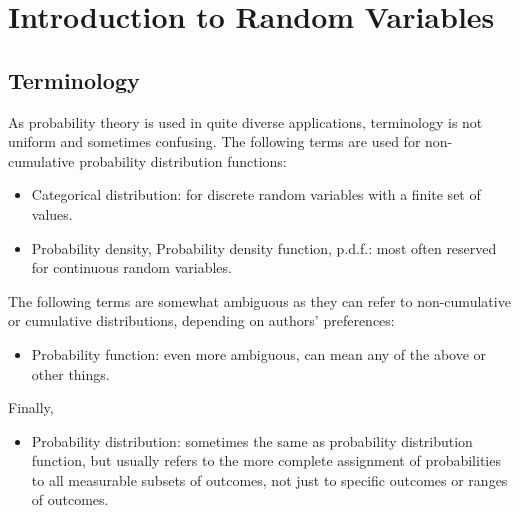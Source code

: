 \documentclass[a4paper,12pt]{article}
\begin{document}
\chapter{Introduction to Random Variables}
\section{Terminology}
As probability theory is used in quite diverse applications, terminology is not uniform and sometimes confusing. The following terms are used for non-cumulative probability distribution functions:
\begin{itemize}
\itemProbability mass, Probability mass function, p.m.f.: for discrete random variables.
\item Categorical distribution: for discrete random variables with a finite set of values.
\item Probability density, Probability density function, p.d.f.: most often reserved for continuous random variables.
\end{itemize}
The following terms are somewhat ambiguous as they can refer to non-cumulative or cumulative distributions, depending on authors' preferences:
\begin{itemize}
\itemProbability distribution function: continuous or discrete, non-cumulative or cumulative.
\item Probability function: even more ambiguous, can mean any of the above or other things.
\end{itemize}Finally,
\begin{itemize}
\item Probability distribution: sometimes the same as probability distribution function, but usually refers to the more complete assignment of probabilities to all measurable subsets of outcomes, not just to specific outcomes or ranges of outcomes.
\end{itemize}

\end{document}

